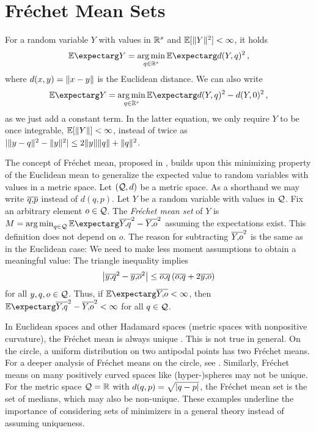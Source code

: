 %
\section{Fréchet Mean Sets}
%
%
For a random variable $Y$ with values in $\mathbb{R}^s$ and $\mathbb{E}[\Vert Y \Vert^2]<\infty$, it holds
\begin{equation*}
	\Ex{Y} = \argmin_{q\in\R^s} \Ex{d(Y,q)^2}
	\eqcm
\end{equation*}
where $d(x,y) = \Vert x-y \Vert$ is the Euclidean distance. We can also write 
\begin{equation*}
	\Ex{Y} = \argmin_{q\in\R^s} \Ex{d(Y,q)^2-d(Y,0)^2}
	\eqcm
\end{equation*}
as we just add a constant term. In the latter equation, we only require $Y$ to be once integrable, $\mathbb{E}[\Vert Y \Vert]<\infty$, instead of twice as $|\Vert y-q \Vert^2-\Vert y \Vert^2| \leq 2\Vert y \Vert\Vert q \Vert+\Vert q \Vert^2$.

The concept of Fréchet mean, proposed in \cite{frechet48}, builds upon this minimizing property of the Euclidean mean to generalize the expected value to random variables with values in a metric space. Let $(\mathcal{Q}, d)$ be a metric space. As a shorthand we may write $\overline{q,\!p}$ instead of $d(q,p)$. Let $Y$ be a random variable with values in $\mathcal{Q}$. Fix an arbitrary element $o\in \mathcal{Q}$. The \emph{Fréchet mean set} of $Y$ is $M = \argmin_{q\in\mc Q} \Ex{\ol Yq^2- \ol Yo^2}$ assuming the expectations exist. 
This definition does not depend on $o$. The reason for subtracting $\overline{Y,\!o}^2$ is the same as in the Euclidean case: We need to make less moment assumptions to obtain a meaningful value: The triangle inequality implies
\begin{equation*}
\left| \overline{y,\!q}^2 - \overline{y,\!o}^2 \right| \leq \overline{o,\!q} \left( \overline{o,\!q} + 2 \overline{y,\!o} \right)
\end{equation*}
for all $y,q,o\in\mathcal{Q}$. Thus, if $\Ex{\ol Yo} < \infty$, then $\Ex{\ol Yq^2 - \ol Yo^2} < \infty$ for all $q\in\mathcal{Q}$.

In Euclidean spaces and other Hadamard spaces (metric spaces with nonpositive curvature), the Fréchet mean is always unique \cite[Proposition 4.3]{sturm03}. This is not true in general. On the circle, a uniform distribution on two antipodal points has two Fréchet means. For a deeper analysis of Fréchet means on the circle, see \cite{hotz15}. Similarly, Fréchet means on many positively curved spaces like (hyper-)spheres may not be unique. For the metric space $\mathcal{Q} = \mathbb{R}$ with $d(q,p) =\sqrt{\left| q-p \right|}$, the Fréchet mean set is the set of medians, which may also be non-unique. These examples underline the importance of considering sets of minimizers in a general theory instead of assuming uniqueness.

